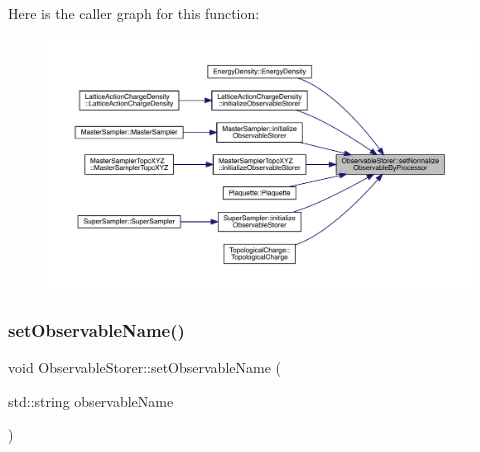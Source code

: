 Here is the caller graph for this function\+:\nopagebreak
\begin{figure}[H]
\begin{center}
\leavevmode
\includegraphics[width=350pt]{class_observable_storer_a6177ade7609fb0e4b739955eecba20e6_icgraph}
\end{center}
\end{figure}
\mbox{\label{class_observable_storer_a7f4847c4fdbf8764d8f07950c4d4b62a}} 
\subsubsection{\texorpdfstring{setObservableName()}{setObservableName()}}
{\footnotesize\ttfamily void Observable\+Storer\+::set\+Observable\+Name (\begin{DoxyParamCaption}\item[{std\+::string}]{observable\+Name }\end{DoxyParamCaption})\hspace{0.3cm}{\ttfamily [inline]}}

